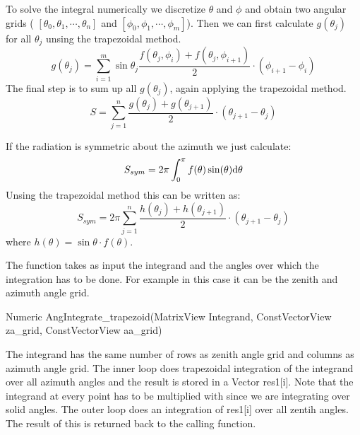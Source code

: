 To solve the integral numerically we discretize $\theta$ and $\phi$ and obtain two angular grids ( $[\theta_0, \theta_1, \cdots, \theta_n]$  and $[\phi_0, \phi_1, \cdots, \phi_m]$). 
Then we can first calculate $g(\theta_j)$ for all $\theta_j$ unsing the trapezoidal method.
\begin{equation}
  g(\theta_j) = \sum_{i=1}^m \sin\theta_j \frac{f(\theta_j, \phi_i) + f(\theta_j, \phi_{i+1})}{2} \cdot (\phi_{i+1} - \phi_i)  
\end{equation}
The final step is to sum up all $g(\theta_j)$, again applying the trapezoidal method.
\begin{equation}
  S = \sum_{j=1}^n \frac{g(\theta_j) + g(\theta_{j+1})}{2} \cdot  (\theta_{j+1} - \theta_j)  
\end{equation}

If the radiation is symmetric about the azimuth we just calculate:
\begin{equation}
  S_{sym} = 2\pi \int_0^{\pi} f(\theta) \sin(\theta) \mathrm{d} \theta 
\end{equation}
Unsing the trapezoidal method this can be written as:
\begin{equation}
  S_{sym} =  2\pi \sum_{j=1}^n \frac{h(\theta_j) + h(\theta_{j+1})}{2} \cdot  (\theta_{j+1} - \theta_j)  
\end{equation}
where $h(\theta) = \sin\theta\cdot f(\theta)$.
 
\vspace{2ex}



The function   takes as input the integrand and the angles over which
the integration has to be done. For example in this case it can be the
zenith and azimuth angle
grid.
\begin{code}  
Numeric AngIntegrate_trapezoid(MatrixView Integrand,
                               ConstVectorView za_grid,
                               ConstVectorView aa_grid)
\end{code}
The integrand has the same number of rows as zenith angle grid
and columns as azimuth angle grid.  The inner loop does trapezoidal
integration of the integrand over all azimuth angles and the result is
stored in a Vector  res1[i]. Note that the integrand at every point
has to be multiplied with 
since we are integrating over solid angles.  The outer loop 
does an integration of res1[i] over all zentih angles.  The result of
this is returned back to the calling function.  


